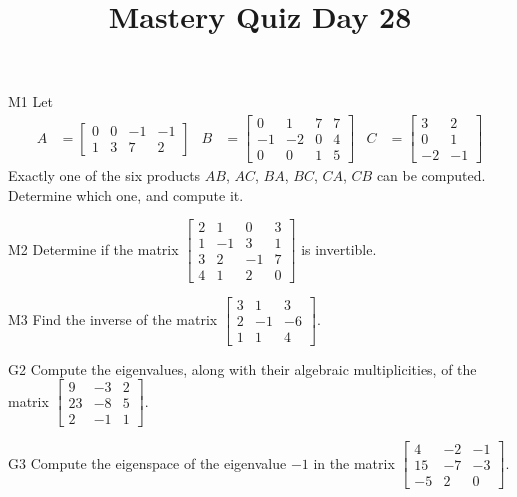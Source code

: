 \documentclass{sbgLAquiz}
\title{Mastery Quiz Day 28 }
\begin{document}
\begin{problem}{M1}
Let
\begin{align*}
A &= \begin{bmatrix} 0 & 0 & -1 & -1 \\ 1 & 3 & 7 & 2 \end{bmatrix} & B &= \begin{bmatrix} 0 & 1 & 7 & 7 \\ -1 & -2 & 0 & 4 \\ 0 & 0 & 1 & 5 \end{bmatrix} & C&=\begin{bmatrix} 3 & 2 \\ 0 & 1 \\ -2 & -1 \end{bmatrix}
\end{align*}
Exactly one of the six products $AB$, $AC$, $BA$, $BC$, $CA$, $CB$ can be computed.  Determine which one, and compute it.
\end{problem}

\begin{problem}{M2}
Determine if the matrix $\begin{bmatrix} 2 & 1 & 0 & 3 \\ 1 & -1 & 3 & 1 \\ 3 & 2 & -1 & 7 \\ 4 & 1 & 2 & 0 \end{bmatrix}$ is invertible.
\end{problem}
\newpage

\begin{problem}{M3}
  Find the inverse of the matrix
  \(\begin{bmatrix}
    3 & 1 & 3  \\
    2 & -1 & -6  \\
    1 & 1 & 4
  \end{bmatrix}\).
\end{problem}

\begin{problem}{G2}
Compute the eigenvalues, along with their algebraic multiplicities, of the matrix $ \begin{bmatrix} 9 & -3 & 2 \\ 23 & -8 & 5 \\  2 & -1 & 1 \end{bmatrix}$.
\end{problem}
\newpage

\begin{problem}{G3}
Compute the eigenspace of the eigenvalue $-1$ in the matrix $\begin{bmatrix} 4 & -2 & -1 \\ 15 & -7 & -3 \\ -5 & 2 & 0 \end{bmatrix}$.
\end{problem}
\end{document}
